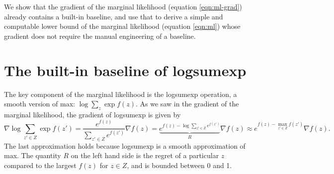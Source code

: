 \documentclass[12pt]{article}
\begin{document}
We show that the gradient of the marginal likelihood (equation \ref{eqn:ml-grad}) already contains
a built-in baseline, and use that to derive a simple and computable lower bound of the marginal likelihood
(equation \ref{eqn:ml}) whose gradient does not require the manual engineering of a baseline.

\section{The built-in baseline of logsumexp}
The key component of the marginal likelihood is the logsumexp operation,
a smooth version of max: $\log \sum_z \exp f(z)$.
As we saw in the gradient of the marginal likelihood, the gradient of logsumexp is given by
$$
\nabla \log \sum_{z'\in Z} \exp f(z')
= \frac{e^{f(z)}}{\sum_{z' \in Z} e^{f(z')}} \nabla f(z)
= \underbrace{e^{f(z) - \log \sum_{z' \in Z} e^{f(z')}}}_{R} \nabla f(z)
\approx e^{f(z) - \max_{z' \in Z} f(z')} \nabla f(z).
$$
The last approximation holds because logsumexp is a smooth approximation of max.
The quantity $R$ on the left hand side is the regret of a particular $z$ compared to
the largest $f(z)$ for $z \in Z$,
and is bounded between 0 and 1.
\end{document}

